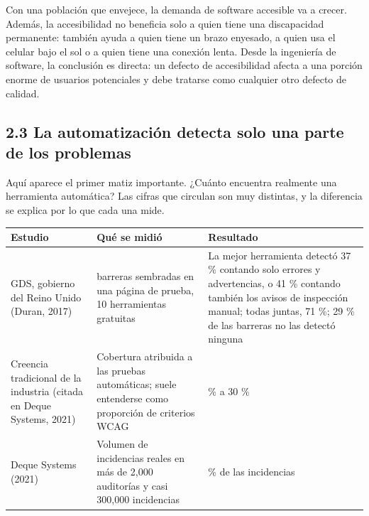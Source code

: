 \documentclass[10pt,letterpaper,onecolumn]{IEEEtran}
\newcommand{\filafina}{\arrayrulecolor{black!30}\specialrule{0.3pt}{1.5pt}{1.5pt}\arrayrulecolor{black}}
\begin{document}
Con una población que envejece, la demanda de software accesible va a crecer. Además, la accesibilidad no beneficia solo a quien tiene una discapacidad permanente: también ayuda a quien tiene un brazo enyesado, a quien usa el celular bajo el sol o a quien tiene una conexión lenta. Desde la ingeniería de software, la conclusión es directa: un defecto de accesibilidad afecta a una porción enorme de usuarios potenciales y debe tratarse como cualquier otro defecto de calidad.

\subsection{2.3 La automatización detecta solo una parte de los problemas}\label{la-automatizaciuxf3n-detecta-solo-una-parte-de-los-problemas}

Aquí aparece el primer matiz importante. ¿Cuánto encuentra realmente una herramienta automática? Las cifras que circulan son muy distintas, y la diferencia se explica por lo que cada una mide.

\begin{longtable}[]{@{}
  >{\raggedright\arraybackslash}p{0.2778\dimexpr\linewidth-4\tabcolsep\relax}
  >{\raggedright\arraybackslash}p{0.4167\dimexpr\linewidth-4\tabcolsep\relax}
  >{\raggedright\arraybackslash}p{0.3056\dimexpr\linewidth-4\tabcolsep\relax}@{}}
\toprule\noalign{}
\begin{minipage}[b]{\linewidth}\raggedright
Estudio
\end{minipage} & \begin{minipage}[b]{\linewidth}\raggedright
Qué se midió
\end{minipage} & \begin{minipage}[b]{\linewidth}\raggedright
Resultado
\end{minipage} \\
\midrule\noalign{}
\endhead
\bottomrule\noalign{}
\endlastfoot
GDS, gobierno del Reino Unido (Duran, 2017) & 143 barreras sembradas en una página de prueba, 10 herramientas gratuitas & La mejor herramienta detectó 37 \% contando solo errores y advertencias, o 41 \% contando también los avisos de inspección manual; todas juntas, 71 \%; 29 \% de las barreras no las detectó ninguna \\ \filafina
Creencia tradicional de la industria (citada en Deque Systems, 2021) & Cobertura atribuida a las pruebas automáticas; suele entenderse como proporción de criterios WCAG & 20 \% a 30 \% \\ \filafina
Deque Systems (2021) & Volumen de incidencias reales en más de 2,000 auditorías y casi 300,000 incidencias & 57 \% de las incidencias \\
\end{longtable}
\end{document}
